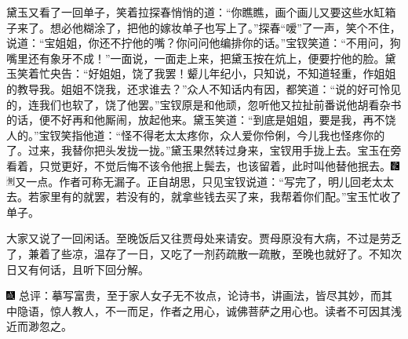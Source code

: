 黛玉又看了一回单子，笑着拉探春悄悄的道：``你瞧瞧，画个画儿又要这些水缸箱子来了。想必他糊涂了，把他的嫁妆单子也写上了。''探春``嗳''了一声，笑个不住，说道：``宝姐姐，你还不拧他的嘴？你问问他编排你的话。''宝钗笑道：``不用问，狗嘴里还有象牙不成！''一面说，一面走上来，把黛玉按在炕上，便要拧他的脸。黛玉笑着忙央告：``好姐姐，饶了我罢！颦儿年纪小，只知说，不知道轻重，作姐姐的教导我。姐姐不饶我，还求谁去？''众人不知话内有因，都笑道：``说的好可怜见的，连我们也软了，饶了他罢。''宝钗原是和他顽，忽听他又拉扯前番说他胡看杂书的话，便不好再和他厮闹，放起他来。黛玉笑道：``到底是姐姐，要是我，再不饶人的。''宝钗笑指他道：``怪不得老太太疼你，众人爱你伶俐，今儿我也怪疼你的了。过来，我替你把头发拢一拢。''黛玉果然转过身来，宝钗用手拢上去。宝玉在旁看着，只觉更好，不觉后悔不该令他抿上鬓去，也该留着，此时叫他替他抿去。{\includegraphics[width=3mm]{../Images/00006}\includegraphics[width=3mm]{../Images/00011}\footnotesize \kaishu 又一点。作者可称无漏子。}正自胡思，只见宝钗说道：``写完了，明儿回老太太去。若家里有的就罢，若没有的，就拿些钱去买了来，我帮着你们配。''宝玉忙收了单子。

大家又说了一回闲话。至晚饭后又往贾母处来请安。贾母原没有大病，不过是劳乏了，兼着了些凉，温存了一日，又吃了一剂药疏散一疏散，至晚也就好了。不知次日又有何话，且听下回分解。

{\includegraphics[width=3mm]{../Images/00005} \kaishu 总评：摹写富贵，至于家人女子无不妆点，论诗书，讲画法，皆尽其妙，而其中隐语，惊人教人，不一而足，作者之用心，诚佛菩萨之用心也。读者不可因其浅近而渺忽之。}
